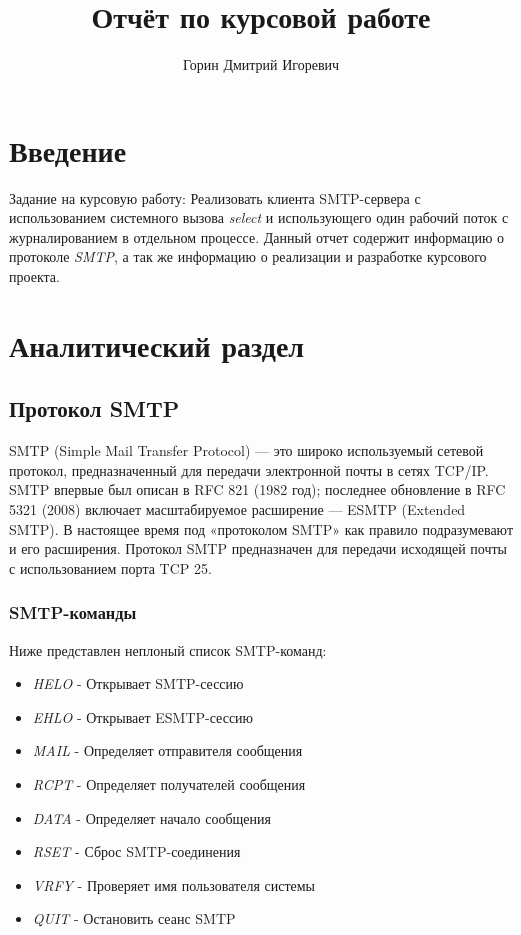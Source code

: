 \documentclass[a4paper,12pt]{report}
\title{Отчёт по курсовой работе}
\author{Горин Дмитрий Игоревич}
\begin{document}
\maketitle

\tableofcontents

\chapter*{Введение}

Задание на курсовую работу: Реализовать клиента SMTP-сервера с использованием системного вызова \textit{select} и использующего один рабочий поток с журналированием в отдельном процессе.
Данный отчет содержит информацию о протоколе \textit{SMTP}, а так же информацию о реализации и разработке курсового проекта.

\chapter{Аналитический раздел}

\section{Протокол SMTP}

SMTP (Simple Mail Transfer Protocol) — это широко используемый сетевой протокол, предназначенный для передачи электронной почты в сетях TCP/IP.
SMTP впервые был описан в RFC 821 (1982 год); последнее обновление в RFC 5321 (2008) включает масштабируемое расширение — ESMTP (Extended SMTP).
В настоящее время под «протоколом SMTP» как правило подразумевают и его расширения.
Протокол SMTP предназначен для передачи исходящей почты с использованием порта TCP 25.

\subsection{SMTP-команды}

Ниже представлен неплоный список SMTP-команд:
\begin{itemize}
    \item \textit{HELO} - Открывает SMTP-сессию
    \item \textit{EHLO} - Открывает ESMTP-сессию
    \item \textit{MAIL} - Определяет отправителя сообщения
    \item \textit{RCPT} - Определяет получателей сообщения
    \item \textit{DATA} - Определяет начало сообщения
    \item \textit{RSET} - Сброс SMTP-соединения
    \item \textit{VRFY} - Проверяет имя пользователя системы
    \item \textit{QUIT} - Остановить сеанс SMTP
\end{itemize}
\end{document}
